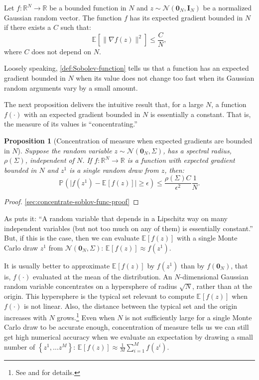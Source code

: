 \documentclass[12pt]{article}
\newtheorem{proposition}{Proposition}
\newcommand{\set}[1]{\ensuremath{\left\{{#1}\right\}}}
\newcommand{\prob}[2][]{\ensuremath{\mathbb{P}_{#1}\left( {#2} \right)}}
\newcommand{\expec}[2][]{\ensuremath{\mathbb{E}_{{#1}}\left[ {#2} \right]}}
\begin{document}
\begin{definition} \label{def:Sobolev-function} Let $f:\mathbb{R}^N\rightarrow \mathbb{R}$ be a bounded function in $N$ and $z\sim \mathcal{N}(\mathbf{0}_N,\mathbf{I}_N)$ be a normalized Gaussian random vector. The function $f$ has its expected gradient bounded in $N$ if there exists a $C$ such that:
\begin{equation*}
\expec{\|\nabla f(z)\|^2} \leq \frac{C}{N},
\end{equation*}
where $C$ does not depend on $N$.
\end{definition}	

Loosely speaking, \cref{def:Sobolev-function} tells us that a function has an expected gradient bounded in $N$ when its value does not change too fast when its Gaussian random arguments vary by a small amount.

The next proposition delivers the intuitive result that, for a large $N$, a function $f(\cdot)$ with an expected gradient bounded in $N$ is essentially a constant. That is, the measure of its values is ``concentrating.''

\begin{proposition}[Concentration of measure when expected gradients are bounded in $N$]\label{prop:concentrate-sobolev-func}
Suppose the random variable $z \sim \mathcal{N}(\mathbf{0}_N,\Sigma)$, has a spectral radius, $\rho(\Sigma)$, independent of $N$. If $f:\mathbb{R}^N \rightarrow \mathbb{R}$ is a function with expected gradient bounded in $N$ and $z^1$ is a single random draw from $z$, then:
\begin{equation*}
\prob{\big|f(z^1)-\expec{f(z)}\big|\geq \epsilon} \leq \frac{\rho(\Sigma) C}{\epsilon^2} \frac{1}{N}.
\end{equation*}
\end{proposition}
\begin{proof}
\cref{sec:concentrate-soblov-func-proof}	
\end{proof}

As \citet{ledoux2001concentration} puts it: ``A random variable that depends in a Lipschitz way on many independent variables (but not too much on any of them) is essentially constant.'' But, if this is the case, then we can evaluate $\expec{f(z)}$ with a single Monte Carlo draw $z^1$ from $\mathcal{N}(\mathbf{0}_N,\Sigma)$: $\expec{f(z)} \approx f(z^1)$. 

It is usually better to approximate $\expec{f(z)}$ by $f(z^1)$ than by $f(\mathbf{0}_N)$, that is, $f(\cdot)$ evaluated at the mean of the distribution. An $N$-dimensional Gaussian random variable concentrates on a hypersphere of radius $\sqrt{N}$, rather than at the origin. This hypersphere is the typical set relevant to compute $\expec{f(z)}$ when $f(\cdot)$ is not linear. Also, the distance between the typical set and the origin increases with $N$ grows.\footnote{See \citet{vershynin2018high} and \citet{FVGG2021} for details.} Even when $N$ is not sufficiently large for a single Monte Carlo draw to be accurate enough, concentration of measure tells us we can still get high numerical accuracy when we evaluate an expectation by drawing a small number of $\set{z^1, \ldots z^M}$: $\expec{f(z)} \approx \frac{1}{M}\sum_{i=1}^M f(z^i)$.
\end{document}
